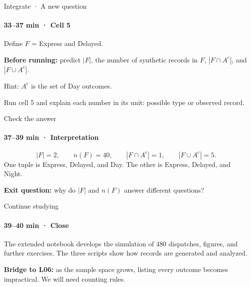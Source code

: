 \documentclass[aspectratio=169,11pt,english]{beamer}
\begin{document}
\begin{frame}{Integrate · A new question}
\framesubtitle{33–37 min · Cell 5}
Define $F$ = Express and Delayed.

\medskip
\textbf{Before running:} predict $|F|$, the number of synthetic records in $F$, $|F\cap A^c|$, and $|F\cup A^c|$.

\medskip
Hint: $A^c$ is the set of Day outcomes.

\medskip
Run cell 5 and explain each number in its unit: possible type or observed record.
\end{frame}
\begin{frame}{Check the answer}
\framesubtitle{37–39 min · Interpretation}
\[
|F|=2,\qquad n(F)=40,\qquad
|F\cap A^c|=1,\qquad |F\cup A^c|=5.
\]
One tuple is Express, Delayed, and Day. The other is Express, Delayed, and Night.

\medskip
\textbf{Exit question:} why do $|F|$ and $n(F)$ answer different questions?
\end{frame}
\begin{frame}{Continue studying}
\framesubtitle{39–40 min · Close}
The extended notebook develops the simulation of 480 dispatches, figures, and further exercises. The three scripts show how records are generated and analyzed.

\medskip
\textbf{Bridge to L06:} as the sample space grows, listing every outcome becomes impractical. We will need counting rules.
\end{frame}
\end{document}
